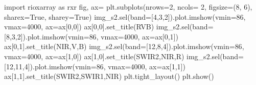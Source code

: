 \documentclass[
  french,
  11pt,
  letterpaper,
  open=any,
  twoside=false,
  french]{scrbook}
\newenvironment{Shaded}{\begin{snugshade}}{\end{snugshade}}
\newcommand{\DecValTok}[1]{\textcolor[rgb]{0.68,0.00,0.00}{#1}}
\newcommand{\ImportTok}[1]{\textcolor[rgb]{0.00,0.46,0.62}{#1}}
\newcommand{\NormalTok}[1]{\textcolor[rgb]{0.00,0.23,0.31}{#1}}
\newcommand{\OperatorTok}[1]{\textcolor[rgb]{0.37,0.37,0.37}{#1}}
\newcommand{\StringTok}[1]{\textcolor[rgb]{0.13,0.47,0.30}{#1}}
\newcommand{\VariableTok}[1]{\textcolor[rgb]{0.07,0.07,0.07}{#1}}
\begin{document}
\begin{Shaded}
\begin{Highlighting}[]
\ImportTok{import}\NormalTok{ rioxarray }\ImportTok{as}\NormalTok{ rxr}
\NormalTok{fig, ax}\OperatorTok{=}\NormalTok{ plt.subplots(nrows}\OperatorTok{=}\DecValTok{2}\NormalTok{, ncols}\OperatorTok{=} \DecValTok{2}\NormalTok{, figsize}\OperatorTok{=}\NormalTok{(}\DecValTok{8}\NormalTok{, }\DecValTok{6}\NormalTok{), sharex}\OperatorTok{=}\VariableTok{True}\NormalTok{, sharey}\OperatorTok{=}\VariableTok{True}\NormalTok{)}
\NormalTok{img\_s2.sel(band}\OperatorTok{=}\NormalTok{[}\DecValTok{4}\NormalTok{,}\DecValTok{3}\NormalTok{,}\DecValTok{2}\NormalTok{]).plot.imshow(vmin}\OperatorTok{=}\DecValTok{86}\NormalTok{, vmax}\OperatorTok{=}\DecValTok{4000}\NormalTok{, ax}\OperatorTok{=}\NormalTok{ax[}\DecValTok{0}\NormalTok{,}\DecValTok{0}\NormalTok{])}
\NormalTok{ax[}\DecValTok{0}\NormalTok{,}\DecValTok{0}\NormalTok{].set\_title(}\StringTok{\textquotesingle{}RVB\textquotesingle{}}\NormalTok{)}
\NormalTok{img\_s2.sel(band}\OperatorTok{=}\NormalTok{[}\DecValTok{8}\NormalTok{,}\DecValTok{3}\NormalTok{,}\DecValTok{2}\NormalTok{]).plot.imshow(vmin}\OperatorTok{=}\DecValTok{86}\NormalTok{, vmax}\OperatorTok{=}\DecValTok{4000}\NormalTok{, ax}\OperatorTok{=}\NormalTok{ax[}\DecValTok{0}\NormalTok{,}\DecValTok{1}\NormalTok{])}
\NormalTok{ax[}\DecValTok{0}\NormalTok{,}\DecValTok{1}\NormalTok{].set\_title(}\StringTok{\textquotesingle{}NIR,V,B\textquotesingle{}}\NormalTok{)}
\NormalTok{img\_s2.sel(band}\OperatorTok{=}\NormalTok{[}\DecValTok{12}\NormalTok{,}\DecValTok{8}\NormalTok{,}\DecValTok{4}\NormalTok{]).plot.imshow(vmin}\OperatorTok{=}\DecValTok{86}\NormalTok{, vmax}\OperatorTok{=}\DecValTok{4000}\NormalTok{, ax}\OperatorTok{=}\NormalTok{ax[}\DecValTok{1}\NormalTok{,}\DecValTok{0}\NormalTok{])}
\NormalTok{ax[}\DecValTok{1}\NormalTok{,}\DecValTok{0}\NormalTok{].set\_title(}\StringTok{\textquotesingle{}SWIR2,NIR,R\textquotesingle{}}\NormalTok{)}
\NormalTok{img\_s2.sel(band}\OperatorTok{=}\NormalTok{[}\DecValTok{12}\NormalTok{,}\DecValTok{11}\NormalTok{,}\DecValTok{4}\NormalTok{]).plot.imshow(vmin}\OperatorTok{=}\DecValTok{86}\NormalTok{, vmax}\OperatorTok{=}\DecValTok{4000}\NormalTok{, ax}\OperatorTok{=}\NormalTok{ax[}\DecValTok{1}\NormalTok{,}\DecValTok{1}\NormalTok{])}
\NormalTok{ax[}\DecValTok{1}\NormalTok{,}\DecValTok{1}\NormalTok{].set\_title(}\StringTok{\textquotesingle{}SWIR2,SWIR1,NIR\textquotesingle{}}\NormalTok{)}
\NormalTok{plt.tight\_layout()}
\NormalTok{plt.show()}
\end{Highlighting}
\end{Shaded}
\end{document}

